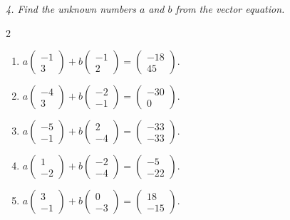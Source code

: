 \emph{4. Find the unknown numbers $a$ and $b$ from the vector equation.}
\bigskip
\begin{multicols}{2}\raggedright
\small
\begin{enumerate}[label=\arabic*.,  leftmargin=*]
\item $a\begin{pmatrix} -1 \\ 3 \end{pmatrix} + b\begin{pmatrix} -1 \\ 2 \end{pmatrix} = \begin{pmatrix} -18 \\ 45 \end{pmatrix}$.
\item $a\begin{pmatrix} -4 \\ 3 \end{pmatrix} + b\begin{pmatrix} -2 \\ -1 \end{pmatrix} = \begin{pmatrix} -30 \\ 0 \end{pmatrix}$.
\item $a\begin{pmatrix} -5 \\ -1 \end{pmatrix} + b\begin{pmatrix} 2 \\ -4 \end{pmatrix} = \begin{pmatrix} -33 \\ -33 \end{pmatrix}$.
\item $a\begin{pmatrix} 1 \\ -2 \end{pmatrix} + b\begin{pmatrix} -2 \\ -4 \end{pmatrix} = \begin{pmatrix} -5 \\ -22 \end{pmatrix}$.
\item $a\begin{pmatrix} 3 \\ -1 \end{pmatrix} + b\begin{pmatrix} 0 \\ -3 \end{pmatrix} = \begin{pmatrix} 18 \\ -15 \end{pmatrix}$.

\end{enumerate}
\end{multicols}
